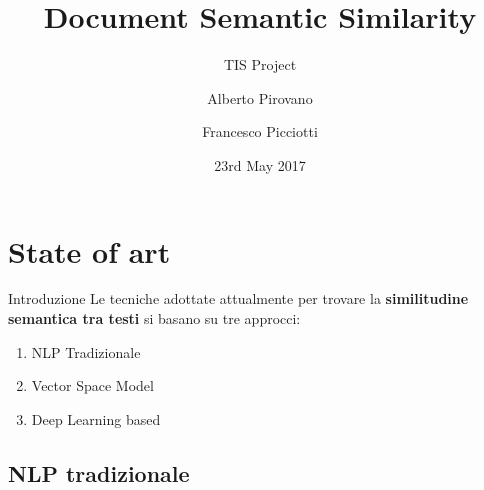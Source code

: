 \documentclass[british]{beamer}
\begin{document}
%
\title[Document Semantic Similarity]
{Document Semantic Similarity}

\subtitle{TIS Project}

\author[A. Pirovano, F. Picciotti]
{Alberto Pirovano \and Francesco Picciotti}

\date{23rd May 2017}





\maketitle

\section{State of art}

\begin{frame}{Introduzione}
	Le tecniche adottate attualmente per trovare la \textbf{similitudine semantica tra testi} si basano su tre approcci:
	\begin{enumerate}
		\item NLP Tradizionale
		\item Vector Space Model
		\item Deep Learning based 
	\end{enumerate}
\end{frame}
	
\subsection{NLP tradizionale}
	
\end{document}
